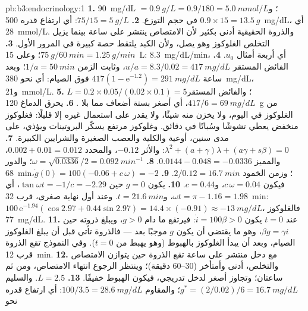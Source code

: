 \begin{solution}{pb:b3:endocrinology:1}
\textbf{1.} \qty{90}{mg/dL} $= \qty{0.9}{g/L} = 0.9/180 = \qty{5.0}{mmol/L}$؛
و$0.9\times 15 = \qty{13.5}{g}$ في حجم التوزع.
\textbf{2.} $75/15 = \qty{5}{g/L}$: أي ارتفاع قدره \qty{500}{mg/dL}،
أي \qty{28}{mmol/L}. والذروة الحقيقية أدنى بكثير لأن الامتصاص
ينتشر على ساعة بينما يزيل التخلص الغلوكوز وهو يصل، ولأن
الكبد يلتقط حصة كبيرة في المرور الأول.
\textbf{3.} $\qty{75}{g}/\qty{60}{min} = \qty{1.25}{g/min}$؛ وعلى
\qty{15}{L}: \qty{8.3}{mg/dL/min}، أي أربعة أمثال $u_{0}$.
\textbf{4.} الفائض المستقر $u/a = 8.3/0.02 = \qty{417}{mg/dL}$، وثابت
الزمن $1/a = \qty{50}{min}$؛ وبعد ساعة $417(1 -
\mathrm{e}^{-1.2}) = \qty{291}{mg/dL}$ فوق الصيام: أي نحو
\qty{380}{mg/dL}، و\qty{21}{mmol/L}.
\textbf{5.} $L = 0.2\times 0.05/(0.02\times 0.1) = 5$؛ والفائض المستقر
$417/6 = \qty{69}{mg/dL}$، أي أصغر بستة أضعاف مما بلا .
\textbf{6.} يحرق الدماغ \qty{120}{g} من الغلوكوز في اليوم، ولا
يخزن منه شيئًا، ولا يقدر على استعمال غيره إلا قليلًا: فغلوكوز
منخفض يعطي تشوشًا وسُباتًا في دقائق. وغلوكوز مرتفع يسكّر
البروتينات ويؤذي، على مدى سنين، أوعية  والكلية والعصب
الصغيرة والشرايين الكبيرة.
\textbf{7.} $\lambda^{2} + (a + \gamma)\lambda + (a\gamma + s\beta) = 0$:
والأثر $-0.12$، والمحدد $0.002 + 0.01 = 0.012$، والمميز
$0.0144 - 0.048 = -0.0336$.
\textbf{8.} $\omega = \sqrt{0.0336}/2 = \qty{0.092}{min^{-1}}$؛ والدور
\qty{68}{min}؛ وزمن الخمود $2/0.12 = \qty{16.7}{min}$.
\textbf{9.} $\dot g(0) = 100(-0.06 + c\,\omega) = -2$، فيكون $c\,\omega =
0.04$، و$c = 0.44$.
\textbf{10.} يكون $g = 0$ حين $\tan\omega t = -1/c = -2.29$، أي $\omega t =
\pi - 1.16 = 1.98$، و$t = \qty{21.6}{min}$. وعند أول نهاية صغرى،
قرب \qty{32}{min}: $100\,\mathrm{e}^{-1.94}(\cos 2.97 + 0.44\sin 2.97) =
14.4\times(-0.91) \approx -\qty{13}{mg/dL}$، فالغلوكوز \qty{77}{mg/dL}.
\textbf{11.} عند $t = 0$ يكون $\dot i = 100\beta > 0$: فيرتفع 
ما دام $g > 0$، ويبلغ ذروته حين $\beta g = \gamma i$، وهو ما يقتضي
أن يكون $g$ موجبًا بعد --- فالذروة تأتي قبل أن يبلغ الغلوكوز
الصيام، وبعد أن يبدأ الغلوكوز بالهبوط (وهو يهبط من $t = 0$).
وفي النموذج تقع الذروة قرب \qty{12}{min}.
\textbf{12.} مع دخل منتشر على ساعة تقع الذروة حين يتوازن
الامتصاص والتخلص، أدنى وأمتأخر (30--60 دقيقة)؛ وينتظر الرجوع
انتهاء الامتصاص، ومن ثم ساعتان؛ وتجاوز  أصغر لدخل
تدريجي، فيكون الهبوط خفيفًا.
\textbf{13.} $L = 2.5$. والسليم $g^{*} = (2/0.02)/6 = \qty{16.7}{mg/dL}$؛
والمقاوم $100/3.5 = \qty{28.6}{mg/dL}$: أي ارتفاع قدره نحو

\end{solution}
